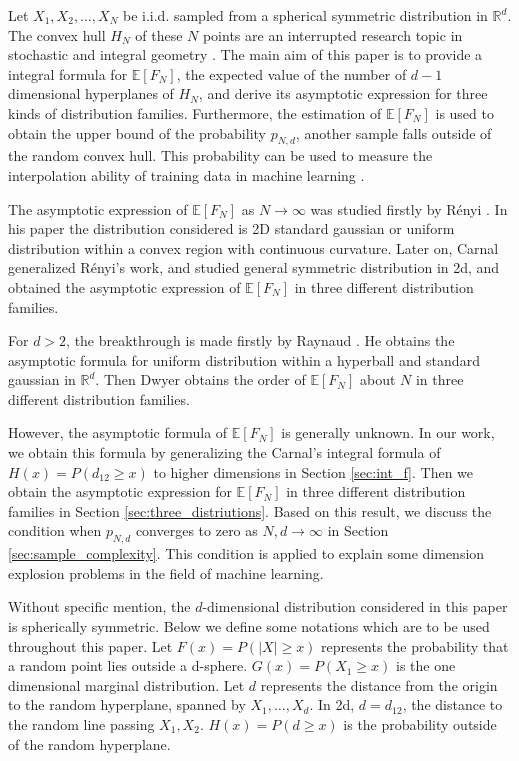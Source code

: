 \documentclass{aptpub}
\def\E{\mathbb{E}}
\begin{document}
Let $X_1, X_2, \dots, X_N$ be i.i.d. sampled from a spherical symmetric distribution in $\mathbb{R}^d$.
The convex hull $H_N$ of these $N$ points are an interrupted research topic in stochastic and integral geometry
\cite{schneider2008stochastic}.
The main aim of this paper is to provide a integral formula for $\E[F_N]$, the expected value of the number of $d-1$ dimensional hyperplanes
of $H_N$,
and derive its asymptotic expression
for three kinds of distribution families. Furthermore, the estimation of $\E[F_N]$ is used to obtain the upper bound
of the probability $p_{N,d}$, another sample falls outside of the random convex hull. This probability can be used to
measure the interpolation ability of training data in machine learning
\cite{balestriero2021learning}.

The asymptotic expression of $\E[F_N]$ as $N\to \infty$
was studied firstly by R{\'e}nyi \cite{renyi1963konvexe}.
In his paper the distribution considered
is 2D standard gaussian or uniform distribution within a convex region with continuous curvature.
Later on, Carnal \cite{carnal1970konvexe} generalized R{\'e}nyi's work,
and studied general symmetric distribution in 2d,
and obtained the asymptotic expression of $\E[F_N]$
in three different distribution families.

For $d>2$, the breakthrough is made firstly by
Raynaud
\cite{raynaud1970enveloppe}.
He obtains the asymptotic formula for uniform distribution within a hyperball
and standard gaussian in $\mathbb{R}^d$.
Then Dwyer \cite{dwyer1991convex} obtains the order of $\E[F_N]$ about $N$
in three different distribution families.

However, the asymptotic formula of $\E[F_N]$ is generally unknown.
In our work, we obtain this formula by generalizing the Carnal's integral formula
of $H(x)=P(d_{12}\geq x)$ to higher dimensions in Section \ref{sec:int_f}.
Then we obtain the asymptotic
expression for $\E[F_N]$ in three different distribution families in Section \ref{sec:three_distriutions}.
Based on this result,
we discuss the condition when $p_{N,d}$ converges to zero as $N,d \to \infty$
in Section \ref{sec:sample_complexity}.
This condition is applied to explain some dimension explosion problems
in the field of machine learning.

Without specific mention, the $d$-dimensional distribution considered in this paper is spherically symmetric.
Below we define some notations which are to be used throughout this paper.
Let $F(x)=P(|X|\geq x)$ represents the probability that a random point lies outside
a d-sphere. $G(x)=P(X_1\geq x)$ is the one dimensional marginal distribution.
Let $d$ represents the distance from the origin to the random hyperplane, spanned by $X_1, \dots, X_d$.
In 2d, $d=d_{12}$, the distance to the random line passing $X_1, X_2$. $H(x)=P(d\geq x)$ is
the probability outside of the random hyperplane.
\end{document}
